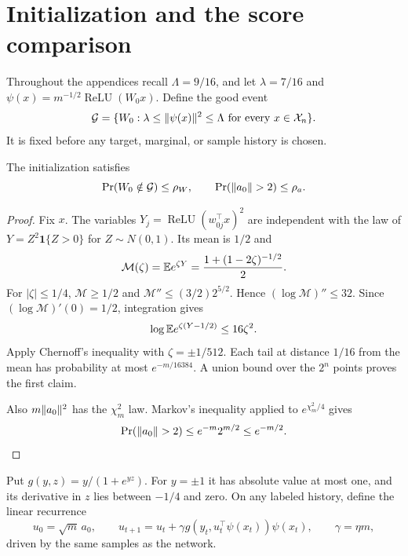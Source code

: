\documentclass[11pt,letterpaper,pmlr,twoside]{jmlr}
\newcommand{\X}{\mathcal X}\newcommand{\Hc}{\mathcal H}
\newcommand{\relu}{\operatorname{ReLU}}\newcommand{\dc}{\operatorname{dc}}
\newcommand{\ind}{\mathbf1}\newcommand{\eps}{\varepsilon}
\newcommand{\Gcal}{\mathcal G}\newcommand{\Bfr}{\mathfrak B}
\begin{document}
\clearpage
\appendix
\section{Initialization and the score comparison}
\label{app:comparison}
Throughout the appendices recall $\Lambda=9/16$, and let $\lambda=7/16$ and $\psi(x)=m^{-1/2}\relu(W_0x)$. Define the good event
\begin{equation}
 \Gcal=\{W_0:\lambda\le\norm{\psi(x)}^2\le\Lambda\text{ for every }x\in\X_n\}.
 \label{eq:good}
\end{equation}
It is fixed before any target, marginal, or sample history is chosen.

\begin{lemma}
\label{lem:init}
The initialization satisfies
\[
 \Pr(W_0\notin\Gcal)\le\rho_W,
 \qquad \Pr(\norm{a_0}>2)\le\rho_a.
\]
\end{lemma}
\begin{proof}
Fix $x$. The variables $Y_j=\relu(w_{0j}^\top x)^2$ are independent with the law of $Y=Z^2\ind\{Z>0\}$ for $Z\sim N(0,1)$. Its mean is $1/2$ and
\[
 \mathcal M(\zeta)=\mathbb E e^{\zeta Y}=\frac{1+(1-2\zeta)^{-1/2}}2.
\]
For $|\zeta|\le1/4$, $\mathcal M\ge1/2$ and $\mathcal M''\le(3/2)2^{5/2}$. Hence $(\log\mathcal M)''\le32$. Since $(\log\mathcal M)'(0)=1/2$, integration gives
\[
 \log\mathbb E e^{\zeta(Y-1/2)}\le16\zeta^2.
\]
Apply Chernoff's inequality with $\zeta=\pm1/512$. Each tail at distance $1/16$ from the mean has probability at most $e^{-m/16384}$. A union bound over the $2^n$ points proves the first claim.

Also $m\lVert a_0\rVert^2$ has the $\chi_m^2$ law. Markov's inequality applied to $e^{\chi_m^2/4}$ gives
\[
 \Pr(\lVert a_0\rVert>2)\le e^{-m}2^{m/2}\le e^{-m/2}.
\]
\end{proof}

Put $g(y,z)=y/(1+e^{yz})$. For $y=\pm1$ it has absolute value at most one, and its derivative in $z$ lies between $-1/4$ and zero. On any labeled history, define the linear recurrence
\begin{equation}
 u_0=\sqrt m\,a_0,
 \qquad
 u_{t+1}=u_t+\gamma g(y_t,u_t^\top\psi(x_t))\psi(x_t),
 \qquad \gamma=\eta m,
 \label{eq:frozen}
\end{equation}
driven by the same samples as the network.
\end{document}
